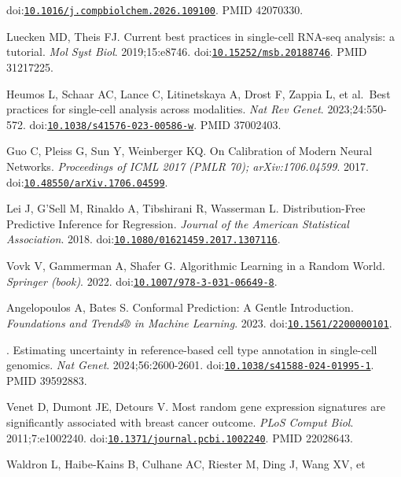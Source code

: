 \documentclass[11pt]{article}
\begin{document}
\begin{enumerate}[label={[\arabic*]},leftmargin=2.6em,labelsep=0.5em,itemsep=1.5pt]
  doi:\href{https://doi.org/10.1016/j.compbiolchem.2026.109100}{\nolinkurl{10.1016/j.compbiolchem.2026.109100}}.
  PMID 42070330.
\item
  Luecken MD, Theis FJ. Current best practices in single-cell RNA-seq
  analysis: a tutorial. \emph{Mol Syst Biol}. 2019;15:e8746.
  doi:\href{https://doi.org/10.15252/msb.20188746}{\nolinkurl{10.15252/msb.20188746}}.
  PMID 31217225.
\item
  Heumos L, Schaar AC, Lance C, Litinetskaya A, Drost F, Zappia L, et
  al.~Best practices for single-cell analysis across modalities.
  \emph{Nat Rev Genet}. 2023;24:550-572.
  doi:\href{https://doi.org/10.1038/s41576-023-00586-w}{\nolinkurl{10.1038/s41576-023-00586-w}}.
  PMID 37002403.
\item
  Guo C, Pleiss G, Sun Y, Weinberger KQ. On Calibration of Modern Neural
  Networks. \emph{Proceedings of ICML 2017 (PMLR 70); arXiv:1706.04599}.
  2017.
  doi:\href{https://doi.org/10.48550/arXiv.1706.04599}{\nolinkurl{10.48550/arXiv.1706.04599}}.
\item
  Lei J, G'Sell M, Rinaldo A, Tibshirani R, Wasserman L.
  Distribution-Free Predictive Inference for Regression. \emph{Journal
  of the American Statistical Association}. 2018.
  doi:\href{https://doi.org/10.1080/01621459.2017.1307116}{\nolinkurl{10.1080/01621459.2017.1307116}}.
\item
  Vovk V, Gammerman A, Shafer G. Algorithmic Learning in a Random World.
  \emph{Springer (book)}. 2022.
  doi:\href{https://doi.org/10.1007/978-3-031-06649-8}{\nolinkurl{10.1007/978-3-031-06649-8}}.
\item
  Angelopoulos A, Bates S. Conformal Prediction: A Gentle Introduction.
  \emph{Foundations and Trends® in Machine Learning}. 2023.
  doi:\href{https://doi.org/10.1561/2200000101}{\nolinkurl{10.1561/2200000101}}.
\item
  . Estimating uncertainty in reference-based cell type annotation in
  single-cell genomics. \emph{Nat Genet}. 2024;56:2600-2601.
  doi:\href{https://doi.org/10.1038/s41588-024-01995-1}{\nolinkurl{10.1038/s41588-024-01995-1}}.
  PMID 39592883.
\item
  Venet D, Dumont JE, Detours V. Most random gene expression signatures
  are significantly associated with breast cancer outcome. \emph{PLoS
  Comput Biol}. 2011;7:e1002240.
  doi:\href{https://doi.org/10.1371/journal.pcbi.1002240}{\nolinkurl{10.1371/journal.pcbi.1002240}}.
  PMID 22028643.
\item
  Waldron L, Haibe-Kains B, Culhane AC, Riester M, Ding J, Wang XV, et

\end{enumerate}
\end{document}
